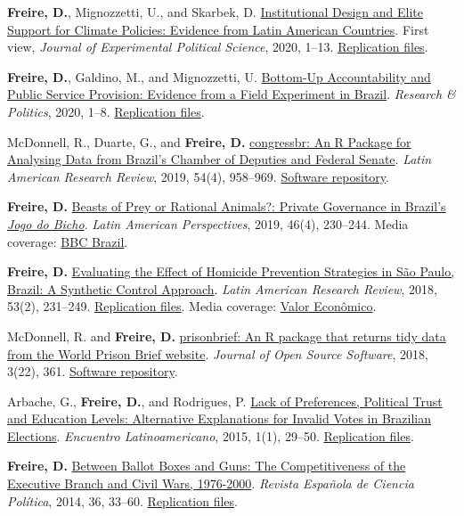\documentclass[a4paper]{article}
\renewenvironment{itemize}{
	\begin{list}{}{
			\setlength{\leftmargin}{1.5em}
		}
		}{
	\end{list}
}
\begin{document}
\begin{itemize}
\item \textbf{Freire, D.}, Mignozzetti, U., and Skarbek, D. \href{http://dx.doi.org/10.1017/XPS.2020.19}{Institutional Design and Elite Support for Climate Policies: Evidence from Latin American Countries}. First view, \textit{Journal of Experimental Political Science}, 2020, 1--13. \href{https://doi.org/10.7910/DVN/VTA5OA}{Replication files}.
\item \textbf{Freire, D.}, Galdino, M., and Mignozzetti, U. \href{https://doi.org/10.1177%2F2053168020914444}{Bottom-Up Accountability and Public Service Provision: Evidence from a Field Experiment in Brazil}. \textit{Research \& Politics}, 2020, 1--8. \href{https://github.com/umbertomig/tdp-accountability}{Replication files}.
\item McDonnell, R., Duarte, G., and \textbf{Freire, D.} \href{https://doi.org/10.25222/larr.447}{congressbr: An R Package for Analysing Data from Brazil's Chamber of Deputies and Federal Senate}. \textit{Latin American Research Review}, 2019, 54(4), 958--969. \href{https://github.com/duarteguilherme/congressbr}{Software repository}.
\item \textbf{Freire, D.} \href{https://doi.org/10.1177/0094582X19846519}{Beasts of Prey or Rational Animals?: Private Governance in Brazil's \emph{Jogo do Bicho}}. \textit{Latin American Perspectives}, 2019, 46(4), 230--244. Media coverage: \href{http://www.bbc.com/portuguese/brasil-40140693}{BBC Brazil}.
\item \textbf{Freire, D.} \href{https://larrlasa.org/articles/10.25222/larr.334/}{Evaluating the Effect of Homicide Prevention Strategies in São Paulo, Brazil: A Synthetic Control Approach}. \textit{Latin American Research Review}, 2018, 53(2), 231--249. \href{https://github.com/danilofreire/homicides-sp-synth}{Replication files}. Media coverage: \href{http://www.valor.com.br/cultura/5111524/sangue-no-asfalto}{Valor Econômico}.
\item McDonnell, R. and \textbf{Freire, D.} \href{https://doi.org/10.21105/joss.00361}{prisonbrief: An R package that returns tidy data from the World Prison Brief website}. \textit{Journal of Open Source Software}, 2018, 3(22), 361. \href{https://github.com/danilofreire/prisonbrief}{Software repository}.
\item Arbache, G., \textbf{Freire, D.}, and Rodrigues, P. \href{http://www.iapss.org/wp-content/uploads/2014/10/ELA1.1_2.Lack-of-Preferences-Political-Trust-and-Education-Levels.pdf}{Lack of Preferences, Political Trust and Education Levels: Alternative Explanations for Invalid Votes in Brazilian Elections}. \textit{Encuentro Latinoamericano}, 2015, 1(1), 29--50. \href{https://github.com/danilofreire/invalid-votes-brazil}{Replication files}.
\item \textbf{Freire, D.} \href{http://recyt.fecyt.es/index.php/recp/article/view/37638}{Between Ballot Boxes and Guns: The Competitiveness of the Executive Branch and Civil Wars, 1976-2000}. \textit{Revista Española de Ciencia Política}, 2014, 36, 33--60. \href{https://doi.org/10.7910/DVN/NSDUYG}{Replication files}.
\end{itemize}
\end{document}

